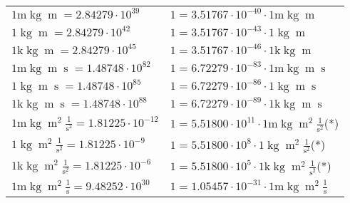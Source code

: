 \begin{center}
\begin{longtable}{l l}
{\color{gray}$1 \bm{\mathrm{ m}}\operatorname{kg}{\operatorname{m}}{}{}{} = 2.84279\cdot10^{39} $}   & {\color{gray}$ 1 = 3.51767\cdot10^{-40} \cdot 1 \bm{\mathrm{ m}}\operatorname{kg}{\operatorname{m}}{}{}{}$}  \\
{\color{black}$1 \bm{\mathrm{ }}\operatorname{kg}{\operatorname{m}}{}{}{} = 2.84279\cdot10^{42} $}   & {\color{black}$ 1 = 3.51767\cdot10^{-43} \cdot 1 \bm{\mathrm{ }}\operatorname{kg}{\operatorname{m}}{}{}{}$}  \\
{\color{gray}$1 \bm{\mathrm{ k}}\operatorname{kg}{\operatorname{m}}{}{}{} = 2.84279\cdot10^{45} $}   & {\color{gray}$ 1 = 3.51767\cdot10^{-46} \cdot 1 \bm{\mathrm{ k}}\operatorname{kg}{\operatorname{m}}{}{}{}$}  \\
{\color{gray}$1 \bm{\mathrm{ m}}\operatorname{kg}{\operatorname{m}}{\operatorname{s}}{}{} = 1.48748\cdot10^{82} $}   & {\color{gray}$ 1 = 6.72279\cdot10^{-83} \cdot 1 \bm{\mathrm{ m}}\operatorname{kg}{\operatorname{m}}{\operatorname{s}}{}{}$}  \\
{\color{black}$1 \bm{\mathrm{ }}\operatorname{kg}{\operatorname{m}}{\operatorname{s}}{}{} = 1.48748\cdot10^{85} $}   & {\color{black}$ 1 = 6.72279\cdot10^{-86} \cdot 1 \bm{\mathrm{ }}\operatorname{kg}{\operatorname{m}}{\operatorname{s}}{}{}$}  \\
{\color{gray}$1 \bm{\mathrm{ k}}\operatorname{kg}{\operatorname{m}}{\operatorname{s}}{}{} = 1.48748\cdot10^{88} $}   & {\color{gray}$ 1 = 6.72279\cdot10^{-89} \cdot 1 \bm{\mathrm{ k}}\operatorname{kg}{\operatorname{m}}{\operatorname{s}}{}{}$}  \\
{\color{gray}$1 \bm{\mathrm{ m}}\operatorname{kg}{\operatorname{m}^2}\frac1{\operatorname{s}^2}{}{} = 1.81225\cdot10^{-12} $}   & {\color{gray}$ 1 = 5.51800\cdot10^{11} \cdot 1 \bm{\mathrm{ m}}\operatorname{kg}{\operatorname{m}^2}\frac1{\operatorname{s}^2}{}{}$}\quad(*)\\
{\color{black}$1 \bm{\mathrm{ }}\operatorname{kg}{\operatorname{m}^2}\frac1{\operatorname{s}^2}{}{} = 1.81225\cdot10^{-9} $}   & {\color{black}$ 1 = 5.51800\cdot10^{8} \cdot 1 \bm{\mathrm{ }}\operatorname{kg}{\operatorname{m}^2}\frac1{\operatorname{s}^2}{}{}$}\quad(*)\\
{\color{gray}$1 \bm{\mathrm{ k}}\operatorname{kg}{\operatorname{m}^2}\frac1{\operatorname{s}^2}{}{} = 1.81225\cdot10^{-6} $}   & {\color{gray}$ 1 = 5.51800\cdot10^{5} \cdot 1 \bm{\mathrm{ k}}\operatorname{kg}{\operatorname{m}^2}\frac1{\operatorname{s}^2}{}{}$}\quad(*)\\
{\color{gray}$1 \bm{\mathrm{ m}}\operatorname{kg}{\operatorname{m}^2}\frac1{\operatorname{s}}{}{} = 9.48252\cdot10^{30} $}   & {\color{gray}$ 1 = 1.05457\cdot10^{-31} \cdot 1 \bm{\mathrm{ m}}\operatorname{kg}{\operatorname{m}^2}\frac1{\operatorname{s}}{}{}$}  \\

\end{longtable}
\end{center}
